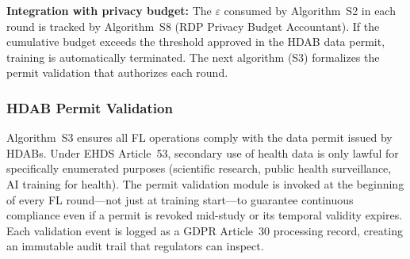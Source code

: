 \documentclass[conference]{IEEEtran}
\begin{document}
\begin{figure}[htbp]
\centering
{}
\end{figure}

\textbf{Integration with privacy budget:} The $\varepsilon$ consumed by Algorithm~S2 in each round is tracked by Algorithm~S8 (RDP Privacy Budget Accountant). If the cumulative budget exceeds the threshold approved in the HDAB data permit, training is automatically terminated. The next algorithm (S3) formalizes the permit validation that authorizes each round.

\subsubsection{HDAB Permit Validation}

Algorithm~S3 ensures all FL operations comply with the data permit issued by HDABs. Under EHDS Article~53, secondary use of health data is only lawful for specifically enumerated purposes (scientific research, public health surveillance, AI training for health). The permit validation module is invoked at the beginning of every FL round---not just at training start---to guarantee continuous compliance even if a permit is revoked mid-study or its temporal validity expires. Each validation event is logged as a GDPR Article~30 processing record, creating an immutable audit trail that regulators can inspect.
\end{document}
